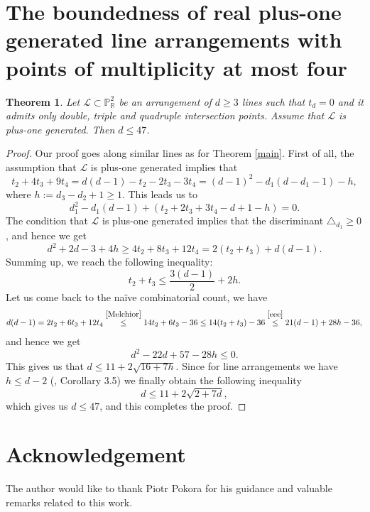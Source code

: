 \documentclass[11pt]{article}
\theoremstyle{plain}
\newtheorem{theorem}{Theorem}[section]
\theoremstyle{definition}
\theoremstyle{remark}
\begin{document}
\section{The boundedness of real plus-one generated line arrangements with points of multiplicity at most four}
\begin{theorem}\label{c}
Let $\mathcal{L} \subset \mathbb{P}^{2}_{\mathbb{R}}$ be an arrangement of $d\geq 3$ lines such that $t_{d}=0$ and it admits only double, triple and quadruple intersection points. Assume that $\mathcal{L}$ is plus-one generated. Then $d \leq 47$.
\end{theorem}
\begin{proof}
Our proof goes along similar lines as for Theorem \ref{main}. First of all, the assumption that $\mathcal{L}$ is plus-one generated implies that 
$$t_{2} + 4t_{3}+9t_{4} = d(d-1) - t_{2} - 2t_{3} - 3t_{4} = (d-1)^2 - d_{1}(d-d_{1}-1)-h,$$
where $h:=d_{3}-d_{2}+1\geq 1$.
This leads us to
$$d_{1}^{2}-d_{1}(d-1)+(t_{2}+2t_{3}+3t_{4}-d+1-h)=0.$$
The condition that $\mathcal{L}$ is plus-one generated implies that the discriminant $\triangle_{d_{1}} \geq 0$, and hence we get
$$d^{2}+2d-3+4h \geq 4t_{2}+8t_{3} + 12t_{4} = 2(t_{2}+t_{3})+d(d-1).$$
Summing up, we reach the following inequality:
\begin{equation}
\label{eee}
t_{2}+t_{3}\leq \frac{3(d-1)}{2}+2h.
\end{equation}
Let us come back to the na\"ive combinatorial count, we have
\begin{multline*}
d(d-1)=2t_{2}+6t_{3}+12t_{4}  \stackrel{\eqref{Melchior}}{\leq} 14t_{2}+6t_{3}-36 \leq 14(t_{2}+t_{3})-36 \stackrel{\eqref{eee}}{\leq}21(d-1)+28h-36,
\end{multline*}
and hence we get $$d^{2}-22d+57-28h \leq 0.$$
This gives us that $d\leq 11 + 2\sqrt{16+7h}.$
Since for line arrangements we have $h \leq d-2$ (\cite{HSch}, Corollary 3.5) we finally obtain the following inequality
\[d \leq 11 + 2\sqrt{2+7d},\]
which gives us $d\leq 47$, and this completes the proof.
\end{proof}

\section*{Acknowledgement}%
The author would like to thank Piotr Pokora for his guidance and valuable remarks related to this work.
\end{document}
